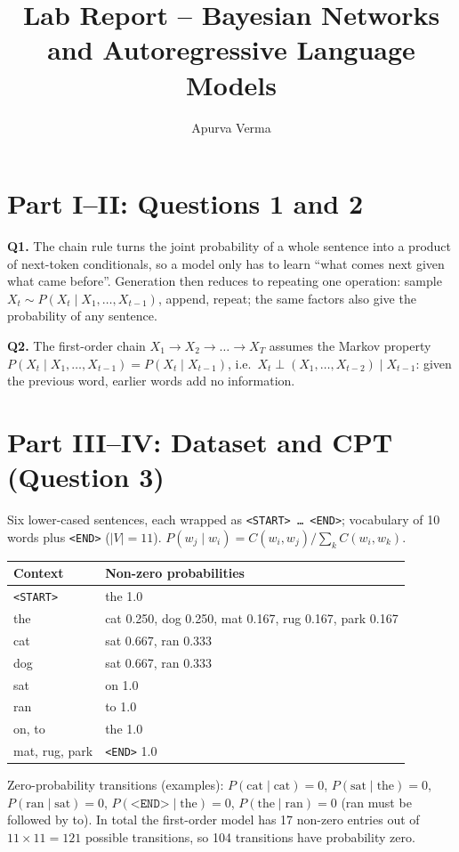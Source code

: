 \documentclass[10pt,a4paper]{article}
\title{Lab Report -- Bayesian Networks and Autoregressive Language Models}
\author{Apurva Verma}\date{}
\begin{document}
\maketitle

\section*{Part I--II: Questions 1 and 2}
\textbf{Q1.} The chain rule turns the joint probability of a whole sentence into a product of next-token conditionals, so a model only has to learn ``what comes next given what came before''. Generation then reduces to repeating one operation: sample $X_t\sim P(X_t\mid X_1,\dots,X_{t-1})$, append, repeat; the same factors also give the probability of any sentence.

\textbf{Q2.} The first-order chain $X_1\to X_2\to\dots\to X_T$ assumes the Markov property $P(X_t\mid X_1,\dots,X_{t-1})=P(X_t\mid X_{t-1})$, i.e.\ $X_t\perp (X_1,\dots,X_{t-2})\mid X_{t-1}$: given the previous word, earlier words add no information.

\section*{Part III--IV: Dataset and CPT (Question 3)}
Six lower-cased sentences, each wrapped as \texttt{<START> \dots\ <END>}; vocabulary of 10 words plus \texttt{<END>} ($|V|=11$). $P(w_j\mid w_i)=C(w_i,w_j)/\sum_k C(w_i,w_k)$.
\begin{center}\begin{tabular}{ll}\toprule Context & Non-zero probabilities\\\midrule
\texttt{<START>} & the 1.0\\
the & cat 0.250, dog 0.250, mat 0.167, rug 0.167, park 0.167\\
cat & sat 0.667, ran 0.333\\
dog & sat 0.667, ran 0.333\\
sat & on 1.0\\
ran & to 1.0\\
on, to & the 1.0\\
mat, rug, park & \texttt{<END>} 1.0\\\bottomrule\end{tabular}\end{center}
Zero-probability transitions (examples): $P(\text{cat}\mid\text{cat})=0$, $P(\text{sat}\mid\text{the})=0$, $P(\text{ran}\mid\text{sat})=0$, $P(\texttt{<END>}\mid\text{the})=0$, $P(\text{the}\mid\text{ran})=0$ (ran must be followed by to). In total the first-order model has 17 non-zero entries out of $11\times11=121$ possible transitions, so 104 transitions have probability zero.
\end{document}
